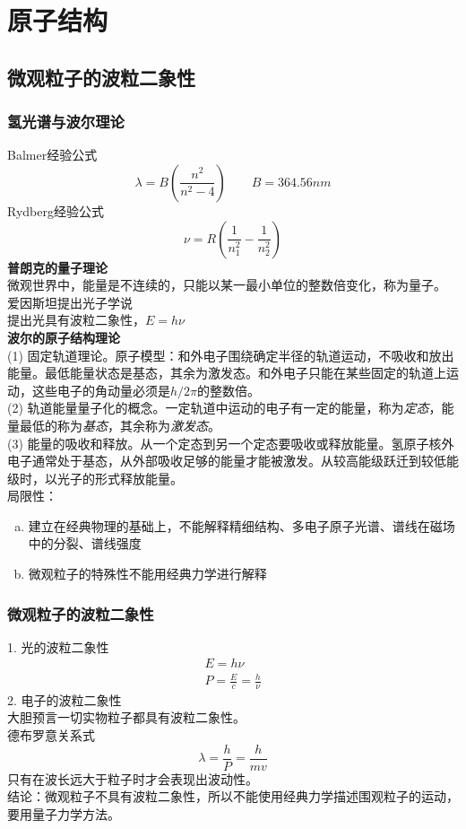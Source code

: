 \documentclass[utf8,a4paper,12pt]{ctexart}
\begin{document}
\section{原子结构}
\subsection{微观粒子的波粒二象性}
\subsubsection{氢光谱与波尔理论}
Balmer经验公式
\[
\lambda  = B(\displaystyle{\frac{n^2}{n^2 - 4}})\qquad B = 364.56nm
\]
Rydberg经验公式
\[
\nu = R(\frac{1}{n_1^2} - \frac{1}{n_2^2})
\]
{\bf 普朗克的量子理论}\\
微观世界中，能量是不连续的，只能以某一最小单位的整数倍变化，称为量子。\\
爱因斯坦提出光子学说\\
提出光具有波粒二象性，$E = h\nu$\\
{\bf 波尔的原子结构理论}\\
(1) 固定轨道理论。原子模型：和外电子围绕确定半径的轨道运动，不吸收和放出能量。最低能量状态是基态，其余为激发态。和外电子只能在某些固定的轨道上运动，这些电子的角动量必须是$h/2\pi$的整数倍。\\
(2) 轨道能量量子化的概念。一定轨道中运动的电子有一定的能量，称为\emph{定态}，能量最低的称为\emph{基态}，其余称为\emph{激发态}。\\
(3) 能量的吸收和释放。从一个定态到另一个定态要吸收或释放能量。氢原子核外电子通常处于基态，从外部吸收足够的能量才能被激发。从较高能级跃迁到较低能级时，以光子的形式释放能量。\\
局限性：
\begin{enumerate}[a.]
\item 建立在经典物理的基础上，不能解释精细结构、多电子原子光谱、谱线在磁场中的分裂、谱线强度
\item 微观粒子的特殊性不能用经典力学进行解释
\end{enumerate}
\subsubsection{微观粒子的波粒二象性}
1. 光的波粒二象性
\begin{align*}
E = h\nu \\
P = \frac{E}{c} = \frac{h}{\nu}
\end{align*}
2. 电子的波粒二象性\\
大胆预言一切实物粒子都具有波粒二象性。\\
德布罗意关系式
\[
\lambda  = \frac{h}{P} = \frac{h}{mv}
\]
只有在波长远大于粒子时才会表现出波动性。\\
结论：微观粒子不具有波粒二象性，所以不能使用经典力学描述围观粒子的运动，要用量子力学方法。
\end{document}
